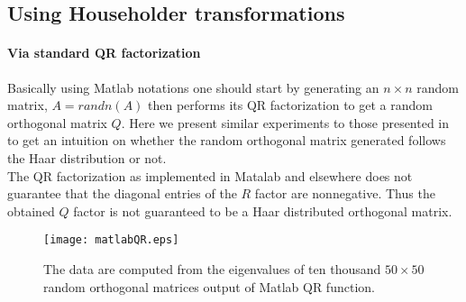\documentclass[a4paper]{article}
\begin{document}
\subsection{Using Householder transformations \\}



\paragraph{Via standard QR factorization \\}

Basically using Matlab notations one should start by generating an $n \times n$ random matrix, $A = randn(A)$ 
then performs its QR factorization to get a random orthogonal matrix $Q$. 
Here we present similar experiments to those presented in \cite[section 4.6]{ANU:298726} to get 
an intuition on whether the random orthogonal matrix generated follows the Haar distribution or not. \\

The QR factorization as implemented in Matalab and elsewhere does not guarantee that the diagonal 
entries of the $R$ factor are nonnegative. Thus the obtained $Q$ factor is not guaranteed to be a Haar distributed 
orthogonal matrix.

\begin{figure}[!htb]
\texttt{[image: matlabQR.eps]}
\caption{The data are computed from the eigenvalues of ten thousand 
$50\times 50$ random orthogonal matrices output of Matlab QR function.}
\label{fig:0}
\end{figure}
\end{document}
